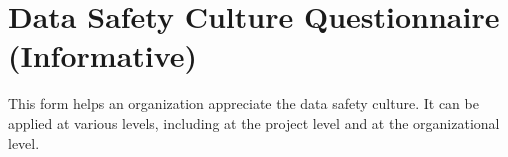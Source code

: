 %
%
\chapter{Data Safety Culture Questionnaire (Informative)} \label{bkm:culture}


This form helps an organization appreciate the data safety culture. It can be applied at various levels, including at the project level and at the organizational level.

